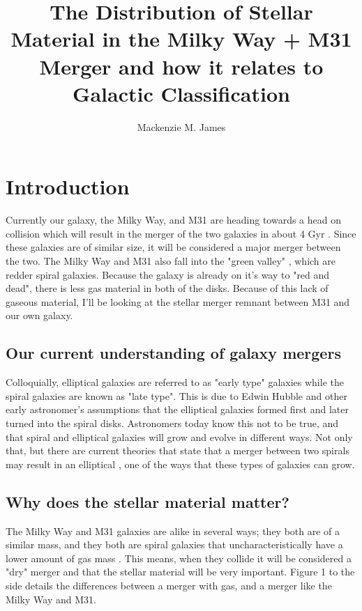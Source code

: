 \documentclass[twocolumn]{aastex63}
\begin{document}
\title{The Distribution of Stellar Material in the Milky Way + M31 Merger and how it relates to Galactic Classification}

\author{Mackenzie M. James}

\section{Introduction}

Currently our galaxy, the Milky Way, and M31 are heading towards a head on collision which will result in the merger of the two galaxies in about 4 Gyr \citep{2012ApJ...753....9V}. Since these galaxies are of similar size, it will be considered a major merger between the two. The Milky Way and M31 also fall into the "green valley" \citep{2011ApJ...736...84M}, which are redder spiral galaxies. Because the galaxy is already on it's way to "red and dead", there is less gas material in both of the disks. Because of this lack of gaseous material, I'll be looking at the stellar merger remnant between M31 and our own galaxy. 


\subsection{Our current understanding of galaxy mergers}
Colloquially, elliptical galaxies are referred to as "early type" galaxies while the spiral galaxies are known as "late type". This is due to Edwin Hubble and other early astronomer's assumptions that the elliptical galaxies formed first and later turned into the spiral disks. Astronomers today know this not to be true, and that spiral and elliptical galaxies will grow and evolve in different ways. Not only that, but there are current theories that state that a merger between two spirals may result in an elliptical \citep{1992ARA&A..30..705B}, one of the ways that these types of galaxies can grow. 

\subsection{Why does the stellar material matter?}
The Milky Way and M31 galaxies are alike in several ways; they both are of a similar mass, and they both are spiral galaxies that uncharacteristically have a lower amount of gas mass \citep{2011ApJ...736...84M}. This means, when they collide it will be considered a "dry" merger and that the stellar material will be very important. Figure 1 to the side details the differences between a merger with gas, and a merger like the Milky Way and M31. 
\end{document}
